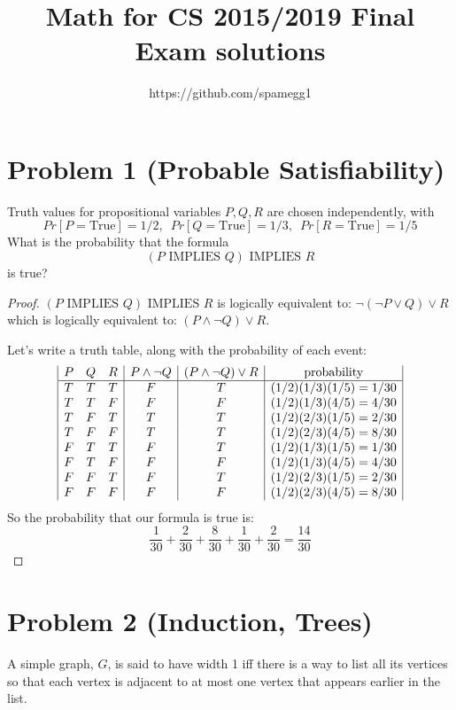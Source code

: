 \documentclass[14pt]{extarticle}
\title{Math for CS 2015/2019 Final Exam solutions}
\author{https://github.com/spamegg1}
\begin{document}
\maketitle
\tableofcontents

\section{Problem 1 (Probable Satisfiability)}
Truth values for propositional variables $P, Q, R$ are chosen independently, with
$$
Pr[P = \text{True}] = 1/2, \,\,\, Pr[Q = \text{True}] = 1/3, \,\,\, Pr[R = \text{True}] = 1/5
$$
What is the probability that the formula
$$
(P \text{ IMPLIES } Q) \text{ IMPLIES } R
$$
is true?
\begin{proof}
$(P \text{ IMPLIES } Q) \text{ IMPLIES } R$ is logically equivalent to:
$\neg(\neg P \vee Q)\vee R$ which is logically equivalent to: $(P \wedge \neg Q) \vee R$.

Let's write a truth table, along with the probability of each event:
$$
\begin{array}{|c c c|c|c|c|}
P & Q & R & P \wedge \neg Q & (P \wedge \neg Q) \vee R & \text{probability}\\ 
\hline 
T & T & T & F & T & (1/2)(1/3)(1/5) = 1/30\\
T & T & F & F & F & (1/2)(1/3)(4/5) = 4/30\\
T & F & T & T & T & (1/2)(2/3)(1/5) = 2/30\\
T & F & F & T & T & (1/2)(2/3)(4/5) = 8/30\\
F & T & T & F & T & (1/2)(1/3)(1/5) = 1/30\\
F & T & F & F & F & (1/2)(1/3)(4/5) = 4/30\\
F & F & T & F & T & (1/2)(2/3)(1/5) = 2/30\\
F & F & F & F & F & (1/2)(2/3)(4/5) = 8/30
\end{array}
$$
So the probability that our formula is true is:
$$
\frac{1}{30} + \frac{2}{30} + \frac{8}{30} + \frac{1}{30} + \frac{2}{30} = \frac{14}{30}
$$
\end{proof}

\section{Problem 2 (Induction, Trees)}
A simple graph, $G$, is said to have width 1 iff there is a way to list all its vertices so that each vertex is adjacent to at most one vertex that appears earlier in the list.
\end{document}
